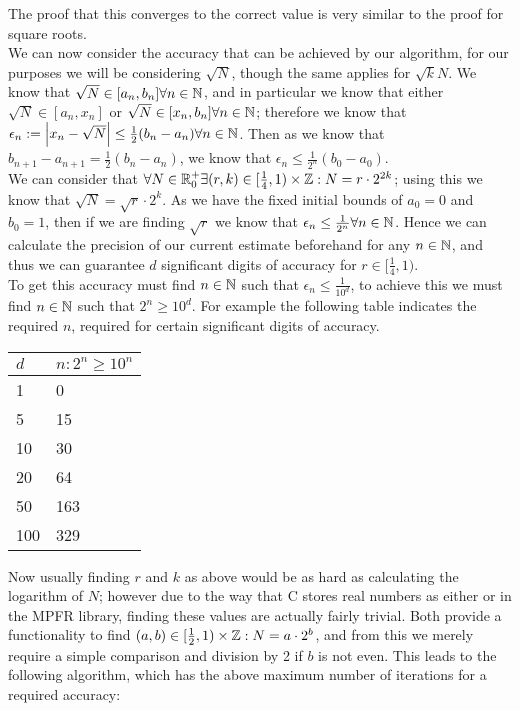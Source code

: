 The proof that this converges to the correct value is very similar to the proof for square roots.\\

We can now consider the accuracy that can be achieved by our algorithm, for our purposes we will be considering \(\sqrt{N}\), though the same applies for \(\sqrt{k}{N}\). We know that \(\sqrt{N} \in [a_n, b_n] \forall n \in \mathbb{N}\), and in particular we know that either \(\sqrt{N} \in [a_n, x_n]\) or \(\sqrt{N} \in [x_n, b_n] \forall n \in \mathbb{N}\); therefore we know that \(\epsilon_n := \left|x_n - \sqrt{N}\right| \le \tfrac{1}{2}(b_n - a_n) \forall n \in \mathbb{N}\). Then as we know that \(b_{n+1} - a_{n+1} = \tfrac{1}{2}(b_n - a_n)\), we know that \(\epsilon_n \le \tfrac{1}{2^n}(b_0 - a_0)\).\\

We can consider that \(\forall N \in \mathbb{R}^+_0 \exists (r,k) \in [\frac{1}{4},1)\times\mathbb{Z} : N = r \cdot 2^{2k}\); using this we know that \(\sqrt{N} = \sqrt{r} \cdot 2^k\). As we have the fixed initial bounds of \(a_0 = 0\) and \(b_0 = 1\), then if we are finding \(\sqrt{r}\) we know that \(\epsilon_n \le \tfrac{1}{2^n} \forall n \in \mathbb{N}\). Hence we can calculate the precision of our current estimate beforehand for any \(n \in \mathbb{N}\), and thus we can guarantee \(d\) significant digits of accuracy for \(r \in [\frac{1}{4}, 1)\).\\

To get this accuracy must find \(n \in \mathbb{N}\) such that \(\epsilon_n \le \tfrac{1}{10^d}\), to achieve this we must find \(n \in \mathbb{N}\) such that \(2^n \ge 10^d\). For example the following table indicates the required \(n\), required for certain significant digits of accuracy.

\begin{center}
	\begin{tabular}{|p{3cm}|p{3cm}|}
	\hline
	\(d\) & \(n : 2^n \ge 10^n\)\\
	\hline
	1 & 0\\\hline
	5 & 15\\\hline
	10 & 30\\\hline
	20 & 64\\\hline
	50 & 163\\\hline
	100 & 329\\\hline
	\end{tabular}
\end{center}

Now usually finding \(r\) and \(k\) as above would be as hard as calculating the logarithm of \(N\); however due to the way that C stores real numbers as either  or in the MPFR library, finding these values are actually fairly trivial. Both provide a functionality to find \((a, b) \in [\frac{1}{2}, 1)\times \mathbb{Z} : N = a\cdot2^b\), and from this we merely require a simple comparison and division by 2 if \(b\) is not even. This leads to the following algorithm, which has the above maximum number of iterations for a required accuracy:


